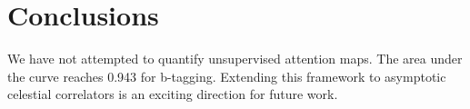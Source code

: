 \section{Conclusions}\label{sec:conclusions}

We have not attempted to quantify unsupervised attention maps. The area
under the curve reaches 0.943 for b-tagging. Extending this framework to
asymptotic celestial correlators is an exciting direction for future
work.

